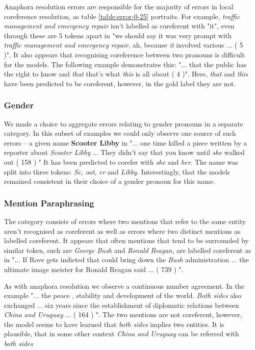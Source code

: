 \documentclass[11pt]{article}
\begin{document}
Anaphora resolution errors are responsible for the majority of errors in local coreference resolution, as table \ref{table:error-0-25} portraits. For example, \textit{traffic management and emergency repair} isn't labelled as coreferent with "it", even through these are 5 tokens apart in "we should say it was very prompt with \textit{traffic management and emergency repair}, ah, because \textit{it} involved various ... ( 5 )". It also appears that recognising coreference between two pronouns is difficult for the models. The following example demonstrates this: "... that the public has the right to know and \textit{that} that's what \textit{this} is all about ( 4 )". Here, \textit{that} and \textit{this} have been predicted to be coreferent, however, in the gold label they are not.

\subsubsection{Gender}
We made a choice to aggregate errors relating to gender pronouns in a separate category. In this subset of examples we could only observe one source of such errors -- a given name \textbf{Scooter Libby} in "... one time killed a piece written by a reporter about \textit{Scooter Libby} ... They didn't say that you know until \textit{she} walked out ( 158 ) " It has been predicted to corefer with \textit{she} and \textit{her}. The name was split into three tokens: \textit{Sc, oot, er} and \textit{Libby}. Interestingly, that the models remained consistent in their choice of a gender pronoun for this name. 


\subsubsection{Mention Paraphrasing} The category consists of errors where two mentions that refer to the same entity aren't recognised as coreferent as well as errors where two distinct mentions as labelled coreferent. It appears that often mentions that tend to be surrounded by similar token, such are \textit{George Bush} and \textit{Ronald Reagan}, are labelled coreferent as in "... If Rove gets indicted that could bring down the \textit{Bush} administration ... the ultimate image meister for Ronald Reagan said ... ( 739 ) ". 

As with anaphora resolution we observe a continuous number agreement. In the example "... the peace , stability and development of the world. \textit{Both sides} also exchanged ... six years since the establishment of diplomatic relations between \textit{China and Uruguay} ... ( 164 ) ". The two mentions are not coreferent, however, the model seems to have learned that \textit{both sides} implies two entities. It is plausible, that in some other context \textit{China and Uruguay} can be referred with \textit{both sides}
\end{document}
